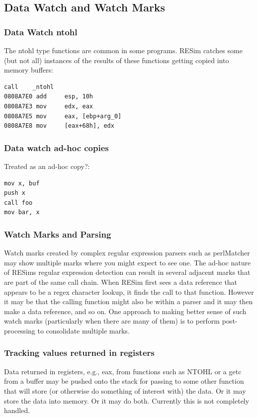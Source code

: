 \documentclass[titlepage]{article}
\begin{document}
\begin{appendices}
\subsection{Data Watch and Watch Marks}
\subsubsection{Data Watch ntohl}
The ntohl type functions are common in some programs.  RESim catches some (but not all) instances of the results of these functions getting copied into memory buffers:
\begin{verbatim}
call    _ntohl
0808A7E0 add     esp, 10h
0808A7E3 mov     edx, eax
0808A7E5 mov     eax, [ebp+arg_0]
0808A7E8 mov     [eax+68h], edx
\end{verbatim}

\subsubsection{Data watch ad-hoc copies}
Treated as an ad-hoc copy?:
\begin{verbatim}
mov x, buf
push x
call foo
mov bar, x
\end{verbatim}

\subsubsection{Watch Marks and Parsing}
Watch marks created by complex regular expression parsers such as perlMatcher may show multiple marks where you might expect to see one.  The ad-hoc nature
of RESims regular expression detection can result in several adjacent marks that are part of the same call chain.  When RESim first sees a data reference
that appears to be a regex character lookup, it finds the call to that function.  However it may be that the calling function might also be within a parser
and it may then make a data reference, and so on.  One approach to making better sense of such watch marks (particularly when there are many of them) is
to perform post-processing to consolidate multiple marks. 

\subsubsection{Tracking values returned in registers}
Data returned in registers, e.g., eax, from functions such as NTOHL or a getc from a buffer may be pushed onto the stack for passing to some
other function that will store (or otherwise do something of interest with) the data.  Or it may store the data into memory.  Or it may do both.
Currently this is not completely handled.


\end{appendices}
\end{document}
